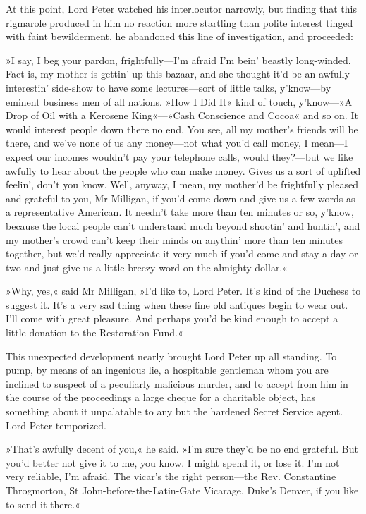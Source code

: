 At this point, Lord Peter watched his interlocutor narrowly, but finding that this rigmarole produced in him no reaction more startling than polite interest tinged with faint bewilderment, he abandoned this line of investigation, and proceeded:

»I say, I beg your pardon, frightfully\allowbreak---\allowbreak I'm afraid I'm bein' beastly long-winded. Fact is, my mother is gettin' up this bazaar, and she thought it'd be an awfully interestin' side-show to have some lectures\allowbreak---\allowbreak sort of little talks, y'know\allowbreak---\allowbreak by eminent business men of all nations. »How I Did It« kind of touch, y'know---»A Drop of Oil with a Kerosene King«---»Cash Conscience and Cocoa« and so on. It would interest people down there no end. You see, all my mother's friends will be there, and we've none of us any money\allowbreak---\allowbreak not what you'd call money, I mean\allowbreak---\allowbreak I expect our incomes wouldn't pay your telephone calls, would they?---but we like awfully to hear about the people who can make money. Gives us a sort of uplifted feelin', don't you know. Well, anyway, I mean, my mother'd be frightfully pleased and grateful to you, Mr Milligan, if you'd come down and give us a few words as a representative American. It needn't take more than ten minutes or so, y'know, because the local people can't understand much beyond shootin' and huntin', and my mother's crowd can't keep their minds on anythin' more than ten minutes together, but we'd really appreciate it very much if you'd come and stay a day or two and just give us a little breezy word on the almighty dollar.«

»Why, yes,« said Mr Milligan, »I'd like to, Lord Peter. It's kind of the Duchess to suggest it. It's a very sad thing when these fine old antiques begin to wear out. I'll come with great pleasure. And perhaps you'd be kind enough to accept a little donation to the Restoration Fund.«

This unexpected development nearly brought Lord Peter up all standing. To pump, by means of an ingenious lie, a hospitable gentleman whom you are inclined to suspect of a peculiarly malicious murder, and to accept from him in the course of the proceedings a large cheque for a charitable object, has something about it unpalatable to any but the hardened Secret Service agent. Lord Peter temporized.

»That's awfully decent of you,« he said. »I'm sure they'd be no end grateful. But you'd better not give it to me, you know. I might spend it, or lose it. I'm not very reliable, I'm afraid. The vicar's the right person\allowbreak---\allowbreak the Rev. Constantine Throgmorton, St John-before-the-Latin-Gate Vicarage, Duke's Denver, if you like to send it there.«

